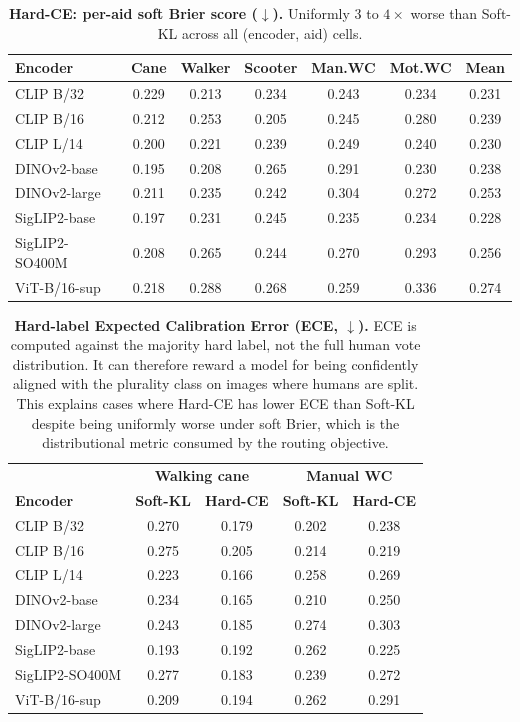 \documentclass[conference]{IEEEtran}
\begin{document}
\begin{table}[!t]
\caption{\textbf{Hard-CE: per-aid soft Brier score ($\downarrow$).} Uniformly 3 to $4\times$ worse than Soft-KL across all (encoder, aid) cells.}
\label{tab:supp_hardce_brier}
\centering\scriptsize
\setlength{\tabcolsep}{4pt}
\begin{tabular}{@{}lcccccc@{}}
\toprule
\textbf{Encoder} & \textbf{Cane} & \textbf{Walker} & \textbf{Scooter} & \textbf{Man.WC} & \textbf{Mot.WC} & \textbf{Mean} \\
\midrule
CLIP B/32      & 0.229 & 0.213 & 0.234 & 0.243 & 0.234 & 0.231 \\
CLIP B/16      & 0.212 & 0.253 & 0.205 & 0.245 & 0.280 & 0.239 \\
CLIP L/14      & 0.200 & 0.221 & 0.239 & 0.249 & 0.240 & 0.230 \\
DINOv2-base    & 0.195 & 0.208 & 0.265 & 0.291 & 0.230 & 0.238 \\
DINOv2-large   & 0.211 & 0.235 & 0.242 & 0.304 & 0.272 & 0.253 \\
SigLIP2-base   & 0.197 & 0.231 & 0.245 & 0.235 & 0.234 & 0.228 \\
SigLIP2-SO400M & 0.208 & 0.265 & 0.244 & 0.270 & 0.293 & 0.256 \\
ViT-B/16-sup   & 0.218 & 0.288 & 0.268 & 0.259 & 0.336 & 0.274 \\
\bottomrule
\end{tabular}
\end{table}

\begin{table}[!t]
\caption{\textbf{Hard-label Expected Calibration Error (ECE, $\downarrow$).} ECE is computed against the majority hard label, not the full human vote distribution. It can therefore reward a model for being confidently aligned with the plurality class on images where humans are split. This explains cases where Hard-CE has lower ECE than Soft-KL despite being uniformly worse under soft Brier, which is the distributional metric consumed by the routing objective.}
\label{tab:supp_ece}
\centering\scriptsize
\setlength{\tabcolsep}{4pt}
\begin{tabular}{@{}lcc|cc@{}}
\toprule
& \multicolumn{2}{c|}{\textbf{Walking cane}} & \multicolumn{2}{c}{\textbf{Manual WC}} \\
\textbf{Encoder} & \textbf{Soft-KL} & \textbf{Hard-CE} & \textbf{Soft-KL} & \textbf{Hard-CE} \\
\midrule
CLIP B/32      & 0.270 & 0.179 & 0.202 & 0.238 \\
CLIP B/16      & 0.275 & 0.205 & 0.214 & 0.219 \\
CLIP L/14      & 0.223 & 0.166 & 0.258 & 0.269 \\
DINOv2-base    & 0.234 & 0.165 & 0.210 & 0.250 \\
DINOv2-large   & 0.243 & 0.185 & 0.274 & 0.303 \\
SigLIP2-base   & 0.193 & 0.192 & 0.262 & 0.225 \\
SigLIP2-SO400M & 0.277 & 0.183 & 0.239 & 0.272 \\
ViT-B/16-sup   & 0.209 & 0.194 & 0.262 & 0.291 \\
\bottomrule
\end{tabular}
\end{table}
\end{document}

